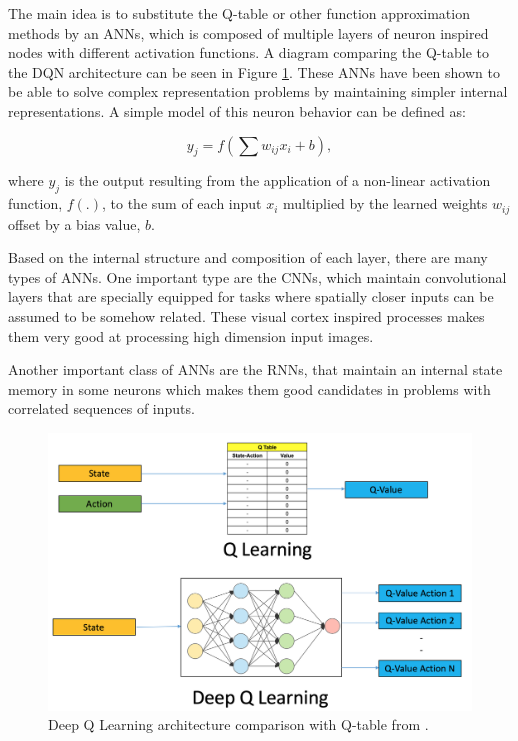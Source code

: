 The main idea is to substitute the Q-table or other function approximation methods by an \acrshort{ANNs}, which is composed of multiple layers of neuron inspired nodes with different activation functions. A diagram comparing the Q-table to the \acrshort{DQN} architecture can be seen in Figure \ref{dqnvsqtable}. These \acrshort{ANNs} have been shown to be able to solve complex representation problems by maintaining simpler internal representations. A simple model of this neuron behavior can be defined as:

\begin{equation}
    y_j = f(\sum w_{ij}x_i + b) ,
\end{equation}

where $y_j$ is the output resulting from the application of a non-linear activation function, $f(.)$, to the sum of each input $x_i$ multiplied by the learned weights $w_{ij}$ offset by a bias value, $b$.

Based on the internal structure and composition of each layer, there are many types of \acrshort{ANNs}. One important type are the \acrfull{CNNs}, which maintain convolutional layers that are specially equipped for tasks where spatially closer inputs can be assumed to be somehow related. These visual cortex inspired processes makes them very good at processing high dimension input images. 

Another important class of \acrshort{ANNs} are the \acrfull{RNNs}, that maintain an internal state memory in some neurons which makes them good candidates in problems with correlated sequences of inputs.

\begin{figure}[h]
  \centering
  \includegraphics[width=\textwidth]{images/DQN.png}
  \caption{Deep Q Learning architecture comparison with Q-table from \cite{dqnimage}.} \label{dqnvsqtable}
\end{figure}

